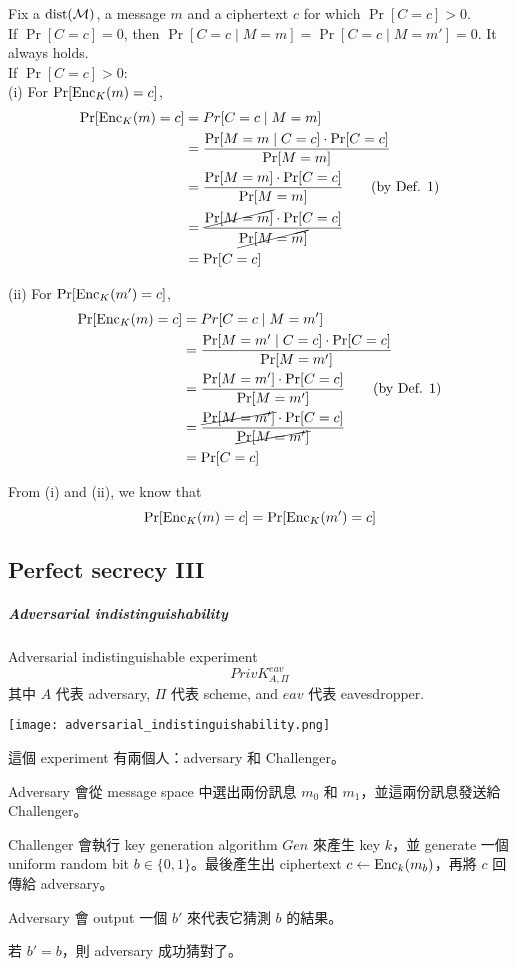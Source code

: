 \begin{myProof}
	Fix a \(\operatorname{dist}(\operatorname{\mathcal{M}})\), a message \(m\) and a ciphertext \(c\) for which \(\Pr[C = c] > 0\). \\
	If \(\Pr[C = c] = 0\), then \(\Pr[C = c \mid M = m] = \Pr[C = c \mid M = m'] = 0\). It always holds. \\
	If \(\Pr[C = c] > 0\): \\
	(i) For \(\Pr[\operatorname{Enc}_K(m) = c]\),
	\begin{align*}
		\Pr[\operatorname{Enc}_K(m) = c] &= Pr[C = c \mid M = m]\\
		&= \frac{\Pr[M = m \mid C = c] \cdot \Pr[C = c]}{\Pr[M = m]} \\
		&= \frac{\Pr[M = m] \cdot \Pr[C =c]}{\Pr[M = m]} \tag{by Def. 1}\\
		&= \frac{\cancel{\Pr[M = m]} \cdot \Pr[C = c]}{\cancel{\Pr[M = m]}} \\
		&= \Pr[C = c]
	\end{align*}
	
	(ii) For \(\Pr[\operatorname{Enc}_K(m') = c]\),
	\begin{align*}
		\Pr[\operatorname{Enc}_K(m) = c] &= Pr[C = c \mid M = m']\\
		&= \frac{\Pr[M = m' \mid C = c] \cdot \Pr[C = c]}{\Pr[M = m']} \\
		&= \frac{\Pr[M = m'] \cdot \Pr[C =c]}{\Pr[M = m']} \tag{by Def. 1} \\
		&= \frac{\cancel{\Pr[M = m']} \cdot \Pr[C = c]}{\cancel{\Pr[M = m']}} \\
		&= \Pr[C = c]
	\end{align*}
	
	From (i) and (ii), we know that
	\[ \Pr[\operatorname{Enc}_K(m) = c] = \Pr[\operatorname{Enc}_K(m') = c] \]
\end{myProof}


\subsection{Perfect secrecy III}

\subparagraph{Adversarial indistinguishability}  \label{PrivK}

Adversarial indistinguishable experiment
\[PrivK_{A, \Pi}^{eav}\]
其中 \(A\) 代表 adversary, \(\Pi\) 代表 scheme, and \(eav\) 代表 eavesdropper.

\texttt{[image: adversarial\_indistinguishability.png]}

這個 experiment 有兩個人：adversary 和 Challenger。
\begin{steps}
	\item Adversary 會從 message space 中選出兩份訊息 \(m_0\) 和 \(m_1\)，並這兩份訊息發送給 Challenger。
	\item Challenger 會執行 key generation algorithm \(Gen\) 來產生 key \(k\)，並 generate 一個 uniform random bit \(b \in \{0,1\}\)。最後產生出 ciphertext \(c \leftarrow \operatorname{Enc}_k(m_b)\)，再將 \(c\) 回傳給 adversary。
	\item Adversary 會 output 一個 \(b'\) 來代表它猜測 \(b\) 的結果。
	\item 若 \(b' = b\)，則 adversary 成功猜對了。
\end{steps}

